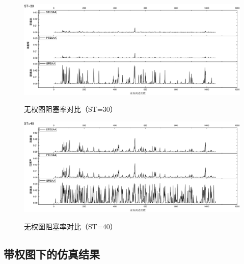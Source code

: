 \begin{figure}
\setlength{\belowcaptionskip}{-0.5cm}
\begin{center}
{\includegraphics[width=1 \textwidth]{figures/B30Z.pdf}}
\end{center}
\caption{{\footnotesize{无权图阻塞率对比（ST=30）}}}
\label{B40Z}
\end{figure}
\begin{figure}
\setlength{\belowcaptionskip}{-0.5cm}
\begin{center}
{\includegraphics[width=1 \textwidth]{figures/B40Z.pdf}}
\end{center}
\caption{{\footnotesize{无权图阻塞率对比（ST=40）}}}
\label{B40Z}
\end{figure}
\subsection{带权图下的仿真结果}
